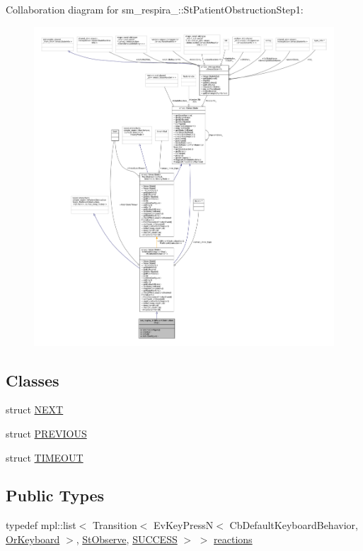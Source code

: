 Collaboration diagram for sm\+\_\+respira\+\_\+:\+:St\+Patient\+Obstruction\+Step1\+:
\nopagebreak
\begin{figure}[H]
\begin{center}
\leavevmode
\includegraphics[width=350pt]{structsm__respira__1_1_1StPatientObstructionStep1__coll__graph}
\end{center}
\end{figure}
\subsection*{Classes}
\begin{DoxyCompactItemize}
\item 
struct \hyperlink{structsm__respira__1_1_1StPatientObstructionStep1_1_1NEXT}{N\+E\+XT}
\item 
struct \hyperlink{structsm__respira__1_1_1StPatientObstructionStep1_1_1PREVIOUS}{P\+R\+E\+V\+I\+O\+US}
\item 
struct \hyperlink{structsm__respira__1_1_1StPatientObstructionStep1_1_1TIMEOUT}{T\+I\+M\+E\+O\+UT}
\end{DoxyCompactItemize}
\subsection*{Public Types}
\begin{DoxyCompactItemize}
\item 
typedef mpl\+::list$<$ Transition$<$ Ev\+Key\+PressN$<$ Cb\+Default\+Keyboard\+Behavior, \hyperlink{classsm__respira__1_1_1OrKeyboard}{Or\+Keyboard} $>$, \hyperlink{structsm__respira__1_1_1StObserve}{St\+Observe}, \hyperlink{classSUCCESS}{S\+U\+C\+C\+E\+SS} $>$ $>$ \hyperlink{structsm__respira__1_1_1StPatientObstructionStep1_a3dbf13d6ef34e327ff7fd96006be763e}{reactions}
\end{DoxyCompactItemize}
